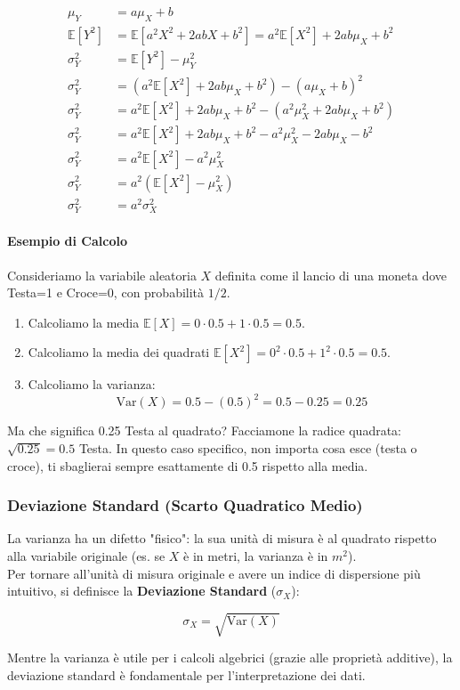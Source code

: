 \begin{align*}
\mu_Y &= a\mu_X + b \\
\mathbb{E}[Y^2] &= \mathbb{E}[a^2X^2 + 2abX + b^2] = a^2\mathbb{E}[X^2] + 2ab\mu_X + b^2 \\
\sigma_Y^2 &= \mathbb{E}[Y^2] - \mu_Y^2 \\
\sigma_Y^2 &= \left(a^2\mathbb{E}[X^2] + 2ab\mu_X + b^2\right) - (a\mu_X + b)^2 \\
\sigma_Y^2 &= a^2\mathbb{E}[X^2] + 2ab\mu_X + b^2 - \left(a^2\mu_X^2 + 2ab\mu_X + b^2\right) \\
\sigma_Y^2 &= a^2\mathbb{E}[X^2] + 2ab\mu_X + b^2 - a^2\mu_X^2 - 2ab\mu_X - b^2 \\
\sigma_Y^2 &= a^2\mathbb{E}[X^2] - a^2\mu_X^2 \\
\sigma_Y^2 &= a^2\left(\mathbb{E}[X^2] - \mu_X^2\right) \\
\sigma_Y^2 &= a^2\sigma_X^2
\end{align*}
\paragraph{Esempio di Calcolo}
Consideriamo la variabile aleatoria $X$ definita come il lancio di una moneta dove Testa=1 e Croce=0, con probabilità $1/2$.
\begin{enumerate}
    \item Calcoliamo la media $\mathbb{E}[X] = 0 \cdot 0.5 + 1 \cdot 0.5 = 0.5$.
    \item Calcoliamo la media dei quadrati $\mathbb{E}[X^2] = 0^2 \cdot 0.5 + 1^2 \cdot 0.5 = 0.5$.
    \item Calcoliamo la varianza:
    \[ \text{Var}(X) = 0.5 - (0.5)^2 = 0.5 - 0.25 = 0.25 \]
\end{enumerate}
Ma che significa 0.25 Testa al quadrato? Facciamone la radice quadrata: $\sqrt{0.25}=0.5$ Testa. In questo caso specifico, non importa cosa esce (testa o croce), ti sbaglierai sempre esattamente di 0.5 rispetto alla media. 

\subsubsection{Deviazione Standard (Scarto Quadratico Medio)}

La varianza ha un difetto "fisico": la sua unità di misura è al quadrato rispetto alla variabile originale (es. se $X$ è in metri, la varianza è in $m^2$).
\\Per tornare all'unità di misura originale e avere un indice di dispersione più intuitivo, si definisce la \textbf{Deviazione Standard} ($\sigma_X$):

\begin{equation}
\sigma_X = \sqrt{\text{Var}(X)}
\end{equation}

Mentre la varianza è utile per i calcoli algebrici (grazie alle proprietà additive), la deviazione standard è fondamentale per l'interpretazione dei dati.

